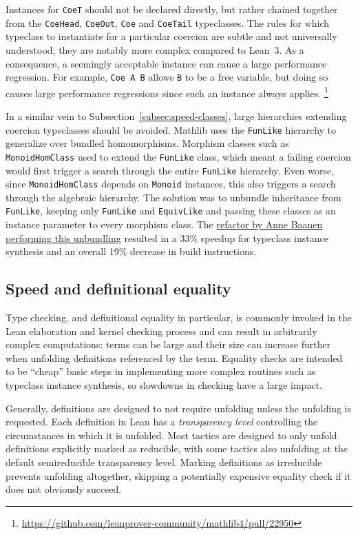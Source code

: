 \documentclass[runningheads]{llncs}
\def\Mathlib{Mathlib\xspace}
\newcommand{\lean}[1]{\texttt{#1}}
\begin{document}
Instances for \lean{CoeT} should not be declared directly, but rather chained together
from the \lean{CoeHead}, \lean{CoeOut}, \lean{Coe} and \lean{CoeTail} typeclasses.
The rules for which typeclass to instantiate for a particular coercion are subtle and not universally understood;
they are notably more complex compared to Lean~3.
As a consequence, a seemingly acceptable instance can cause a large performance regression.
For example, \lean{Coe A B} allows \lean{B} to be a free variable,
but doing so causes large performance regressions since such an instance always applies.%
\footnote{\url{https://github.com/leanprover-community/mathlib4/pull/22950}}

In a similar vein to Subsection~\ref{subsec:speed-classes}, large hierarchies extending coercion typeclasses should be avoided.
\Mathlib uses the \lean{FunLike} hierarchy to generalize over bundled homomorphisms. %
Morphism classes such as \lean{MonoidHomClass} used to extend the \lean{FunLike} class,
which meant a failing coercion would first trigger a search through the entire \lean{FunLike} hierarchy.
Even worse, since \lean{MonoidHomClass} depends on \lean{Monoid} instances,
this also triggers a search through the algebraic hierarchy.
The solution was to unbundle inheritance from \lean{FunLike}, keeping only \lean{FunLike} and \lean{EquivLike}
and passing these classes as an instance parameter to every morphism class.
The \href{https://github.com/leanprover-community/mathlib4/pull/8386}{refactor by Anne Baanen performing this unbundling} resulted in a 33\% speedup for typeclass instance synthesis
and an overall 19\% decrease in build instructions.

\subsection{Speed and definitional equality}
Type checking, and definitional equality in particular,
is commonly invoked in the Lean elaboration and kernel checking process
and can result in arbitrarily complex computations:
terms can be large and their size can increase further when unfolding definitions referenced by the term.
Equality checks are intended to be ``cheap'' basic steps in implementing more complex routines such as typeclass instance synthesis,
so slowdowns in checking have a large impact.

Generally, definitions are designed to not require unfolding unless the unfolding is requested.
Each definition in Lean has a \emph{transparency level} controlling the circumstances in which it is unfolded.
Most tactics are designed to only unfold definitions explicitly marked as reducible,
with some tactics also unfolding at the default semireducible transparency level.
Marking definitions as irreducible prevents unfolding altogether,
skipping a potentially expensive equality check if it does not obviously succeed.
\end{document}
